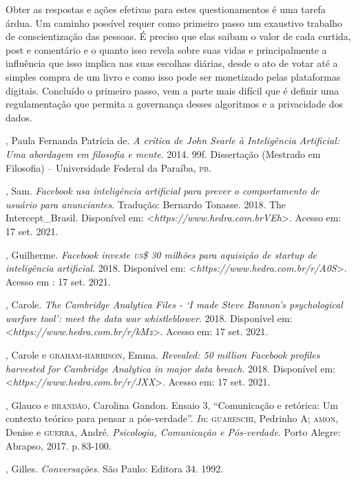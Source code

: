 Obter as respostas e ações efetivas para estes questionamentos é uma
tarefa árdua. Um caminho possível requer como primeiro passo um
exaustivo trabalho de conscientização das pessoas. É preciso que elas
saibam o valor de cada curtida, post e comentário e o quanto isso revela
sobre suas vidas e principalmente a influência que isso implica nas suas
escolhas diárias, desde o ato de votar até a simples compra de um livro
e como isso pode ser monetizado pelas plataformas digitais. Concluído o
primeiro passo, vem a parte mais difícil que é definir uma
regulamentação que permita a governança desses algoritmos e a
privacidade dos dados.

\begin{bibliohedra}
, Paula Fernanda Patrícia de. \emph{A crítica de John Searle à
Inteligência Artificial: Uma abordagem em filosofia e mente}.
2014. 99f. Dissertação (Mestrado em Filosofia) --  Universidade Federal
da Paraíba, \textsc{pb}.

, Sam. \emph{Facebook usa inteligência artificial para prever o
comportamento de usuário para anunciantes}. Tradução: Bernardo
Tonasse. 2018. The Intercept\_Brasil. Disponível em:
\textless{}\emph{https://www.hedra.com.brVEh}\textgreater{}. Acesso em: 17 set. 2021.

, Guilherme. \emph{Facebook investe \textsc{us}\$ 30 milhões para
aquisição de startup de inteligência artificial}. 2018. Disponível em:
\textless{}\emph{https://www.hedra.com.br/r/A0S}\textgreater{}. Acesso em : 17 set. 2021.

, Carole. \emph{The Cambridge Analytica Files - `I made
Steve Bannon's psychological warfare tool': meet the data war
whistleblower}. 2018. Disponível em: \textless{}\emph{https://www.hedra.com.br/r/kMz}\textgreater{}.
Acesso em: 17 set. 2021.

, Carole e \textsc{graham-harrison}, Emma. \emph{Revealed: 50 million
Facebook profiles harvested for Cambridge Analytica in major data
breach}. 2018. Disponível em: \textless{}\emph{https://www.hedra.com.br/r/JXX}\textgreater{}. Acesso em: 17 set. 2021.

, Glauco e \textsc{brandão}, Carolina Gandon. Ensaio 3, ``Comunicação e
retórica: Um contexto teórico para pensar a pós-verdade''. \emph{In}:
\textsc{guareschi}, Pedrinho A; \textsc{amon}, Denise e \textsc{guerra}, André. \emph{Psicologia,
Comunicação e Pós-verdade}. Porto Alegre: Abrapso, 2017. p.\,83-100.

, Gilles. \emph{Conversações}. São Paulo: Editora 34. 1992.


\end{bibliohedra}
